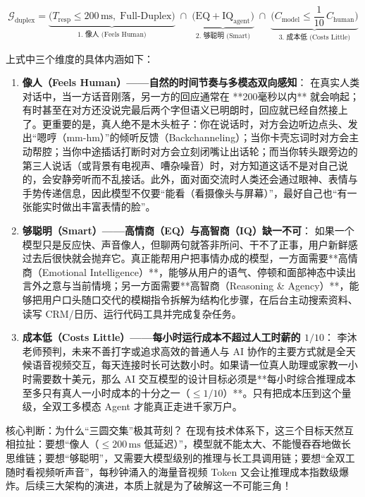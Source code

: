 \documentclass[a4paper]{article}
\begin{document}
\begin{equation}
\mathcal{G}_{\mathrm{duplex}}
= \underbrace{\big(T_{\mathrm{resp}} \le 200\,\mathrm{ms},\;\text{Full-Duplex}\big)}_{\text{1. 像人 (Feels Human)}}
\;\cap\;
\underbrace{\big(\mathrm{EQ} + \mathrm{IQ}_{\mathrm{agent}}\big)}_{\text{2. 够聪明 (Smart)}}
\;\cap\;
\underbrace{\Big(C_{\mathrm{model}} \le \frac{1}{10}\,C_{\mathrm{human}}\Big)}_{\text{3. 成本低 (Costs Little)}}
\end{equation}

上式中三个维度的具体内涵如下：
\begin{enumerate}
    \item \textbf{像人（Feels Human）——自然的时间节奏与多模态双向感知}：
    在真实人类对话中，当一方话音刚落，另一方的回应通常在 **200毫秒以内** 就会响起；有时甚至在对方还没说完最后两个字但语义已明朗时，回应就已经自然接上了。更重要的是，真人绝不是木头桩子：你在说话时，对方会边听边点头、发出“嗯哼（mm-hm）”的倾听反馈（Backchanneling）；当你卡壳忘词时对方会主动帮腔；当你中途插话打断时对方会立刻闭嘴让出话轮；而当你转头跟旁边的第三人说话（或背景有电视声、嘈杂噪音）时，对方知道这话不是对自己说的，会安静旁听而不乱接话。此外，面对面交流时人类还会通过眼神、表情与手势传递信息，因此模型不仅要“能看（看摄像头与屏幕）”，最好自己也“有一张能实时做出丰富表情的脸”。
    \item \textbf{够聪明（Smart）——高情商（EQ）与高智商（IQ）缺一不可}：
    如果一个模型只是反应快、声音像人，但聊两句就答非所问、干不了正事，用户新鲜感过去后很快就会抛弃它。真正能帮用户把事情办成的模型，一方面需要**高情商（Emotional Intelligence）**，能够从用户的语气、停顿和面部神态中读出言外之意与当前情境；另一方面需要**高智商（Reasoning \& Agency）**，能够把用户口头随口交代的模糊指令拆解为结构化步骤，在后台主动搜索资料、读写 CRM/日历、运行代码工具并完成复杂任务。
    \item \textbf{成本低（Costs Little）——每小时运行成本不超过人工时薪的 $1/10$}：
    李沐老师预判，未来不善打字或追求高效的普通人与 AI 协作的主要方式就是全天候语音视频交互，每天连接时长可达数小时。如果请一位真人助理或家教一小时需要数十美元，那么 AI 交互模型的设计目标必须是**每小时综合推理成本至多只有真人一小时成本的十分之一（$\le 1/10$）**。只有把成本压到这个量级，全双工多模态 Agent 才能真正走进千家万户。
\end{enumerate}

\begin{importantbox}{核心判断：为什么“三圆交集”极其苛刻？}
在现有技术体系下，这三个目标天然互相拉扯：要想“像人（$\le 200\,\mathrm{ms}$ 低延迟）”，模型就不能太大、不能慢吞吞地做长思维链；要想“够聪明”，又需要大模型级别的推理与长工具调用链；要想“全双工随时看视频听声音”，每秒钟涌入的海量音视频 Token 又会让推理成本指数级爆炸。后续三大架构的演进，本质上就是为了破解这一不可能三角！
\end{importantbox}
\end{document}
